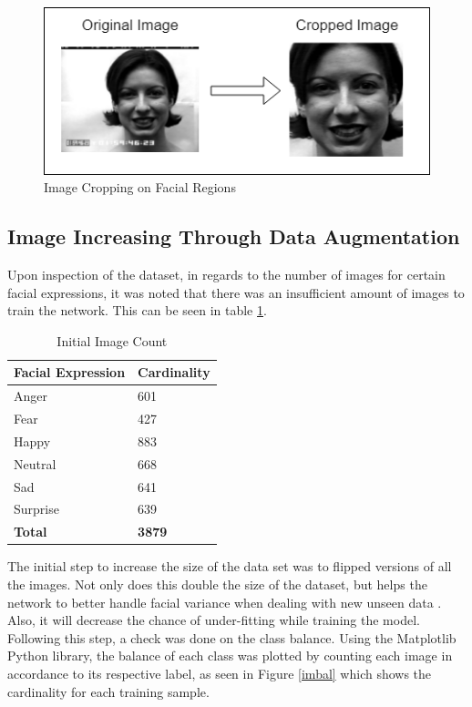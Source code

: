 \begin{figure}[ht]
	\begin{center}
		\advance\leftskip-3cm
		\advance\rightskip-3cm
		\includegraphics[keepaspectratio=true,scale=0.9]{__resources/DATASET/crop.png}
		\caption{Image Cropping on Facial Regions}
		\label{crop}
	\end{center}
\end{figure}
\newpage


\subsection{Image Increasing Through Data Augmentation}
Upon inspection of the dataset, in regards to the number of images for certain facial expressions, it was noted that there was an insufficient amount of images to train the network. This can be seen in table \ref{table: count}. 
\begin{table}[ht]
	\begin{tabular}{ |p{10cm}||p{3cm}|}
		\hline
		\textbf{Facial Expression} & \textbf{Cardinality}\\
		\hline
		\hline
		Anger & 601 \\
		\hline
		Fear & 427	\\
		\hline
		Happy & 883\\
		\hline
		Neutral & 668\\
		\hline
		Sad & 641	\\
		\hline
		Surprise  & 639	\\
		\hline
		\textbf{Total}  & \textbf{3879}	\\
		\hline
	\end{tabular}
	\caption{Initial Image Count}
	\label{table: count}
\end{table}

The initial step to increase the size of the data set was to flipped versions of all the images. Not only does this double the size of the dataset, but helps the network to better handle facial variance when dealing with new unseen data \citep{LOPES}. Also, it will decrease the chance of under-fitting while training the model. Following this step, a check was done on the class balance. Using the Matplotlib Python library, the balance of each class was plotted by counting each image in accordance to its respective label, as seen in Figure \ref{imbal} which shows the cardinality for each training sample.

